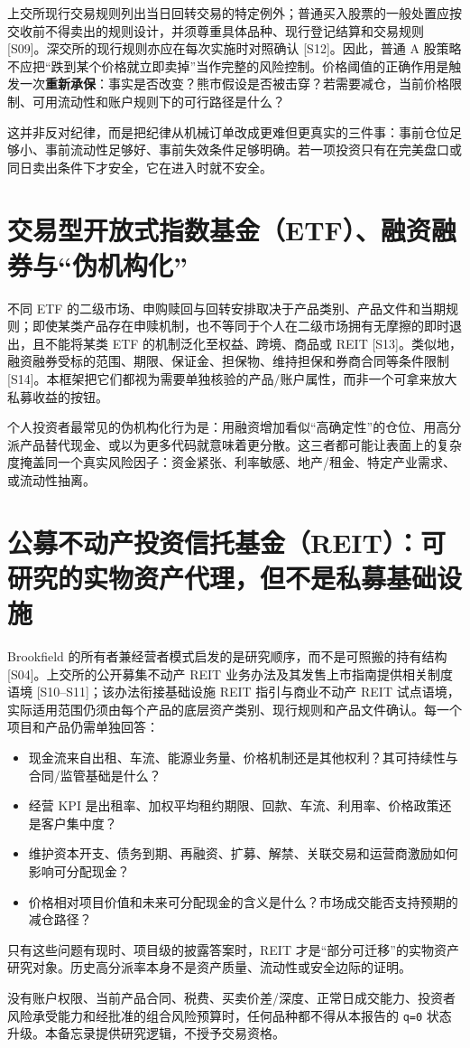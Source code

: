 上交所现行交易规则列出当日回转交易的特定例外；普通买入股票的一般处置应按交收前不得卖出的规则设计，并须尊重具体品种、现行登记结算和交易规则 [S09]。深交所的现行规则亦应在每次实施时对照确认 [S12]。因此，普通 A 股策略不应把“跌到某个价格就立即卖掉”当作完整的风险控制。价格阈值的正确作用是触发一次\textbf{重新承保}：事实是否改变？熊市假设是否被击穿？若需要减仓，当前价格限制、可用流动性和账户规则下的可行路径是什么？

这并非反对纪律，而是把纪律从机械订单改成更难但更真实的三件事：事前仓位足够小、事前流动性足够好、事前失效条件足够明确。若一项投资只有在完美盘口或同日卖出条件下才安全，它在进入时就不安全。

\section{交易型开放式指数基金（ETF）、融资融券与“伪机构化”}

不同 ETF 的二级市场、申购赎回与回转安排取决于产品类别、产品文件和当期规则；即使某类产品存在申赎机制，也不等同于个人在二级市场拥有无摩擦的即时退出，且不能将某类 ETF 的机制泛化至权益、跨境、商品或 REIT [S13]。类似地，融资融券受标的范围、期限、保证金、担保物、维持担保和券商合同等条件限制 [S14]。本框架把它们都视为需要单独核验的产品/账户属性，而非一个可拿来放大私募收益的按钮。

个人投资者最常见的伪机构化行为是：用融资增加看似“高确定性”的仓位、用高分派产品替代现金、或以为更多代码就意味着更分散。这三者都可能让表面上的复杂度掩盖同一个真实风险因子：资金紧张、利率敏感、地产/租金、特定产业需求、或流动性抽离。

\section{公募不动产投资信托基金（REIT）：可研究的实物资产代理，但不是私募基础设施}

Brookfield 的所有者兼经营者模式启发的是研究顺序，而不是可照搬的持有结构 [S04]。上交所的公开募集不动产 REIT 业务办法及其发售上市指南提供相关制度语境 [S10--S11]；该办法衔接基础设施 REIT 指引与商业不动产 REIT 试点语境，实际适用范围仍须由每个产品的底层资产类别、现行规则和产品文件确认。每一个项目和产品仍需单独回答：

\begin{itemize}
  \item 现金流来自出租、车流、能源业务量、价格机制还是其他权利？其可持续性与合同/监管基础是什么？
  \item 经营 KPI 是出租率、加权平均租约期限、回款、车流、利用率、价格政策还是客户集中度？
  \item 维护资本开支、债务到期、再融资、扩募、解禁、关联交易和运营商激励如何影响可分配现金？
  \item 价格相对项目价值和未来可分配现金的含义是什么？市场成交能否支持预期的减仓路径？
\end{itemize}

只有这些问题有现时、项目级的披露答案时，REIT 才是“部分可迁移”的实物资产研究对象。历史高分派率本身不是资产质量、流动性或安全边际的证明。

\begin{riskbox}[实施前的强制暂停]
没有账户权限、当前产品合同、税费、买卖价差/深度、正常日成交能力、投资者风险承受能力和经批准的组合风险预算时，任何品种都不得从本报告的 \texttt{q=0} 状态升级。本备忘录提供研究逻辑，不授予交易资格。
\end{riskbox}
